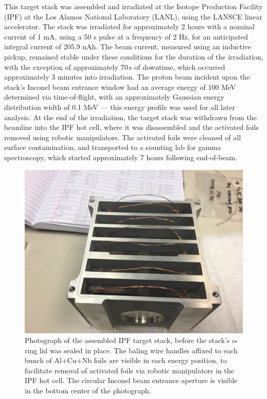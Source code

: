 \documentclass[%
 reprint,
superscriptaddress,
onecolumn,
linenumbers,
notitlepage,
 amsmath,amssymb,
 aps,
prc,
]{revtex4-1}
\begin{document}
This target stack was assembled and irradiated at the Isotope Production Facility (IPF) at the Los Alamos National Laboratory (LANL), using the LANSCE linear accelerator. 
The stack was irradiated for approximately 2 hours with a nominal current of 1 mA, using a 50 \micro s pulse at a frequency of 2 Hz, for an anticipated integral current of 205.9 nAh.
The beam current, measured using an inductive pickup, remained stable under these conditions for the duration of the irradiation, with the exception of approximately 70\,s of downtime, which occurred approximately 3 minutes into irradiation.
The proton beam incident upon the stack's Inconel beam entrance window had an average energy of 100 MeV determined via time-of-flight, with an approximately Gaussian energy distribution width of 0.1 MeV --- this energy profile was used for all later analysis.
At the end of the irradiation, the target stack was withdrawn from the beamline into the IPF hot cell, where it was disassembled and the activated foils removed using robotic manipulators.
The activated foils were cleaned of all surface contamination, and transported to a counting lab for gamma spectroscopy, which started approximately 7 hours following end-of-beam.





\begin{figure}
 \centering
 \includegraphics[scale=0.1,clip=true,trim=13cm 0cm 3cm 6cm]{./figures/IMG_1975.JPG}
 \caption{\label{fig:target_stack}Photograph of the assembled IPF target stack, before the stack's o-ring lid was sealed in place. The baling wire handles affixed to each bunch of Al+Cu+Nb foils are visible in each energy position, to facilitate removal of activated foils via robotic manipulators in the IPF hot cell. The circular Inconel beam entrance aperture is visible in the bottom center of the photograph.  }
\end{figure}
\end{document}
